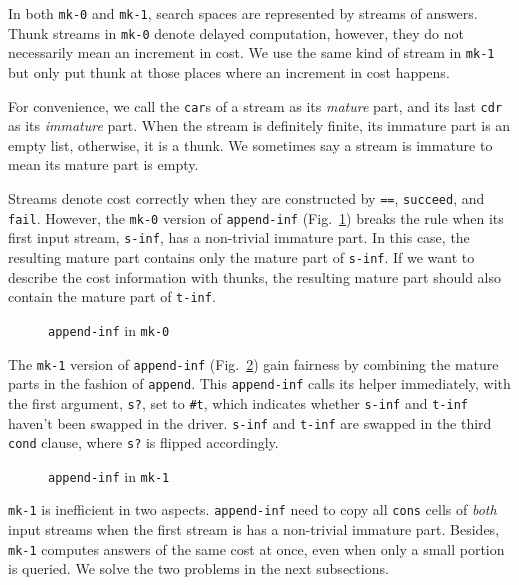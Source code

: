 \documentclass[format=acmlarge, review=true, authordraft=true]{acmart}
\begin{document}
In both \texttt{mk-0} and \texttt{mk-1}, search spaces are represented by 
streams of answers. Thunk streams in \texttt{mk-0} denote delayed 
computation, however, they do not necessarily mean an increment in cost. We use 
the same kind of stream in \texttt{mk-1} but only put thunk at those places 
where an increment in cost happens.

For convenience, we call the \texttt{car}s of a stream as its \emph{mature} 
part, and its last \texttt{cdr} as its \emph{immature} part. When the stream is 
definitely finite, its immature part is an empty list, otherwise, it is a 
thunk. We sometimes say a stream is immature to mean its mature part is empty.

Streams denote cost correctly when they are constructed by \texttt{==}, 
\texttt{succeed}, and \texttt{fail}. However, the \texttt{mk-0} version of 
\texttt{append-inf} (Fig.~\ref{append-inf-0}) breaks the rule when its first input stream, \texttt{s-inf}, has a non-trivial immature part. In this case, the resulting mature part contains only the mature part of \texttt{s-inf}. If we want to describe the cost information with thunks, the resulting mature part should also contain the mature part of \texttt{t-inf}.

\begin{figure}
	 	
	 \caption{\texttt{append-inf} in \texttt{mk-0}}
	 \label{append-inf-0}
\end{figure}

The \texttt{mk-1} version of \texttt{append-inf} (Fig.~\ref{append-inf-1}) 
gain fairness by combining the mature parts in the fashion of \texttt{append}. 
This \texttt{append-inf} calls its helper immediately, with the first argument, 
\texttt{s?}, set to \texttt{\#{}t}, which indicates whether \texttt{s-inf} and \texttt{t-inf} haven't been swapped in the driver. \texttt{s-inf} and \texttt{t-inf} are swapped in the third \texttt{cond} clause, where \texttt{s?} is flipped accordingly.

\begin{figure}
	 	
	 \caption{\texttt{append-inf} in \texttt{mk-1}}
	 \label{append-inf-1}
\end{figure}

\texttt{mk-1} is inefficient in two aspects. \texttt{append-inf} need to copy 
all \texttt{cons} cells of \emph{both} input streams when the first stream is 
has a non-trivial immature part. Besides, \texttt{mk-1} computes answers of the same cost at once, even when only a small portion is queried. We solve the two problems in the next subsections.
\end{document}
